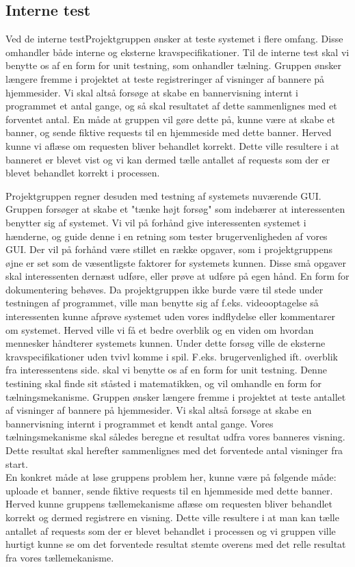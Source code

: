 \documentclass[a4paper,12pt]{article}
\begin{document}
\subsection{Interne test}Ved de interne testProjektgruppen ønsker at teste systemet i flere omfang. Disse omhandler både interne og eksterne kravspecifikationer. Til de interne test skal vi benytte os af en form for unit testning, som onhandler tælning. Gruppen ønsker længere fremme i projektet at teste registreringer af visninger af bannere på hjemmesider. Vi skal altså forsøge at skabe en bannervisning internt i programmet et antal gange, og så skal resultatet af dette sammenlignes med et forventet antal. En måde at gruppen vil gøre dette på, kunne være at skabe et banner, og sende fiktive requests til en hjemmeside med dette banner. Herved kunne vi aflæse om requesten bliver behandlet korrekt. Dette ville resultere i at banneret er blevet vist og vi kan dermed tælle antallet af requests som der er blevet behandlet korrekt i processen.

Projektgruppen regner desuden med testning af systemets nuværende GUI. Gruppen forsøger at skabe et "tænke højt forsøg" som indebærer at interessenten benytter sig af systemet. Vi vil på forhånd give interessenten systemet i hænderne, og guide denne i en retning som tester brugervenligheden af vores GUI. Der vil på forhånd være stillet en række opgaver, som i projektgruppens øjne er set som de væsentligste faktorer for systemets kunnen. Disse små opgaver skal interessenten dernæst udføre, eller prøve at udføre på egen hånd. En form for dokumentering behøves. 
Da projektgruppen ikke burde være til stede under testningen af programmet, ville man benytte sig af f.eks. videooptagelse så interessenten kunne afprøve systemet uden vores indflydelse eller kommentarer om systemet. Herved ville vi få et bedre overblik og en viden om hvordan mennesker håndterer systemets kunnen.
Under dette forsøg ville de eksterne kravspecifikationer uden tvivl komme i spil. F.eks. brugervenlighed ift. overblik fra
interessentens side. skal vi benytte os af en form for unit testning. Denne testining skal finde sit ståsted i matematikken, og vil omhandle en form for tælningsmekanisme. Gruppen ønsker længere fremme i projektet at teste antallet af visninger af bannere på hjemmesider. Vi skal altså forsøge at skabe en bannervisning internt i programmet et kendt antal gange. Vores tælningsmekanisme skal således beregne et resultat udfra vores banneres visning. Dette resultat skal herefter sammenlignes med det forventede antal visninger fra start.
\\ 
En konkret måde at løse gruppens problem her, kunne være på følgende måde: uploade et banner, sende fiktive requests til en hjemmeside med dette banner. Herved kunne gruppens tællemekanisme aflæse om requesten bliver behandlet korrekt og dermed registrere en visning. Dette ville resultere i at man kan tælle antallet af requests som der er blevet behandlet i processen og vi gruppen ville hurtigt kunne se om det forventede resultat stemte overens med det relle resultat fra vores tællemekanisme.
\end{document}
